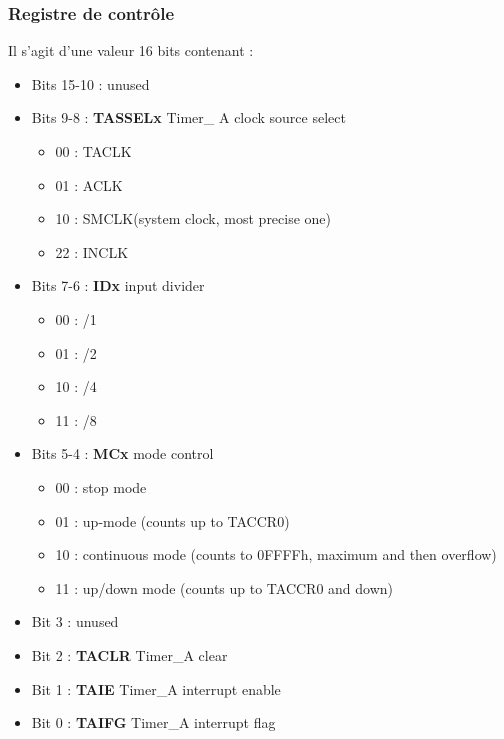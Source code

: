 \documentclass[../main.tex]{subfiles}
\begin{document}
\subsubsection{Registre de contrôle}
Il s'agit d'une valeur 16 bits contenant : \begin{itemize}
    \item Bits 15-10 : unused\\
    \item Bits 9-8 : \textbf{TASSELx} Timer\_ A clock source select \begin{itemize}
        \item 00 : TACLK\\
        \item 01 : ACLK\\
        \item 10 : SMCLK(system clock, most precise one)\\
        \item 22 : INCLK\\
    \end{itemize}
    \item Bits 7-6 : \textbf{IDx} input divider \begin{itemize}
        \item 00 : /1\\
        \item 01 : /2\\
        \item 10 : /4\\
        \item 11 : /8\\
    \end{itemize}
    \item Bits 5-4 : \textbf{MCx} mode control \begin{itemize}
        \item 00 : stop mode\\
        \item 01 : up-mode (counts up to TACCR0)\\
        \item 10 : continuous mode (counts to 0FFFFh, maximum and then overflow)\\
        \item 11 : up/down mode (counts up to TACCR0 and down)\\
    \end{itemize}
    \item Bit 3 : unused\\
    \item Bit 2 : \textbf{TACLR} Timer\_A clear\\
    \item Bit 1 : \textbf{TAIE} Timer\_A interrupt enable\\
    \item Bit 0 : \textbf{TAIFG} Timer\_A interrupt flag\\
\end{itemize}
\end{document}
